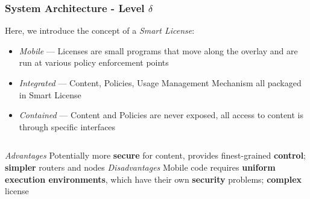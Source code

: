 \begin{frame}[t]
\frametitle{System Architecture - Level $\delta$}

Here, we introduce the concept of a \textit{Smart License}:
\begin{itemize}
\pause
\item \textit{Mobile} --- Licenses are small programs that move along the overlay and are run at various policy enforcement points \cite{proposal:rfc3198}
\pause
\item \textit{Integrated} --- Content, Policies, Usage Management Mechanism all packaged in Smart License
\pause
\item \textit{Contained} --- Content and Policies are never exposed, all access to content is through specific interfaces
\end{itemize}
\pause
\begin{columns}[t]
\textit{Advantages}
\newline
\newline
Potentially more \textbf{secure} for content, provides finest-grained \textbf{control}; \textbf{simpler} routers and nodes
\textit{Disadvantages}
\newline
\newline
Mobile code requires \textbf{uniform execution environments}, which have their own \textbf{security} problems; \textbf{complex} license
\end{columns}
\end{frame}